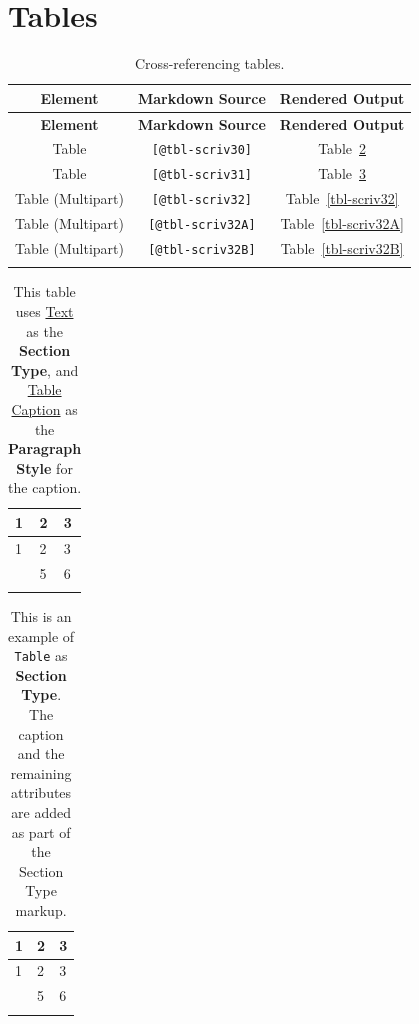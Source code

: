 \documentclass[
  12pt,
  a4paper,
  oneside,
  numbers=noenddot,
  titlepage,
  toclink=all,
  toc=bibliography]{scrbook}
\theoremstyle{definition}
\theoremstyle{definition}
\theoremstyle{definition}
\theoremstyle{plain}
\theoremstyle{plain}
\theoremstyle{plain}
\theoremstyle{plain}
\theoremstyle{plain}
\theoremstyle{remark}
\begin{document}
\newpage{}

\hypertarget{sec-scriv29}{%
\section{Tables}\label{sec-scriv29}}

\hypertarget{tbl-scriv29}{}
\begin{longtable}[]{@{}ccc@{}}
\toprule\noalign{}
\textbf{Element} & \textbf{Markdown Source} & \textbf{Rendered
Output} \\
\midrule\noalign{}
\endfirsthead
\toprule\noalign{}
\textbf{Element} & \textbf{Markdown Source} & \textbf{Rendered
Output} \\
\midrule\noalign{}
\endhead
\bottomrule\noalign{}
\endlastfoot
Table & \texttt{{[}@tbl-scriv30{]}} &
\protect\hypertarget{cite_84}{}{\label{cite_84}Table~\ref{tbl-scriv30}} \\
Table & \texttt{{[}@tbl-scriv31{]}} &
\protect\hypertarget{cite_85}{}{\label{cite_85}Table~\ref{tbl-scriv31}} \\
Table (Multipart) & \texttt{{[}@tbl-scriv32{]}} &
\protect\hypertarget{cite_86}{}{\label{cite_86}Table~\ref{tbl-scriv32}} \\
Table (Multipart) & \texttt{{[}@tbl-scriv32A{]}} &
\protect\hypertarget{cite_87}{}{\label{cite_87}Table~\ref{tbl-scriv32A}} \\
Table (Multipart) & \texttt{{[}@tbl-scriv32B{]}} &
\protect\hypertarget{cite_88}{}{\label{cite_88}Table~\ref{tbl-scriv32B}} \\
\caption{\label{tbl-scriv29}Cross-referencing tables.}\tabularnewline
\end{longtable}

\hypertarget{tbl-scriv30}{}
\begin{longtable}[]{@{}lll@{}}
\toprule\noalign{}
1 & 2 & 3 \\
\midrule\noalign{}
\endfirsthead
\toprule\noalign{}
1 & 2 & 3 \\
\midrule\noalign{}
\endhead
\bottomrule\noalign{}
\endlastfoot
4 & 5 & 6 \\
\caption{\label{tbl-scriv30}This table uses \ul{Text} as the
\textbf{Section Type}, and \ul{Table Caption} as the \textbf{Paragraph
Style} for the caption.}\tabularnewline
\end{longtable}

\hypertarget{tbl-scriv31}{}
\begin{longtable}[]{@{}lll@{}}
\toprule\noalign{}
1 & 2 & 3 \\
\midrule\noalign{}
\endfirsthead
\toprule\noalign{}
1 & 2 & 3 \\
\midrule\noalign{}
\endhead
\bottomrule\noalign{}
\endlastfoot
4 & 5 & 6 \\
\caption{\label{tbl-scriv31}This is an example of \texttt{Table} as
\textbf{Section Type}. The caption and the remaining attributes are
added as part of the Section Type markup.}\tabularnewline
\end{longtable}
\end{document}
